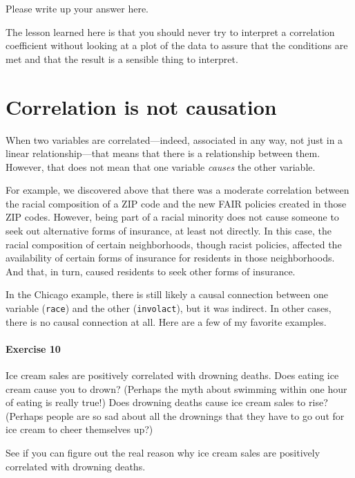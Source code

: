 \documentclass[
]{book}
\begin{document}
Please write up your answer here.

The lesson learned here is that you should never try to interpret a correlation coefficient without looking at a plot of the data to assure that the conditions are met and that the result is a sensible thing to interpret.

\hypertarget{correlation-causation}{%
\section{Correlation is not causation}\label{correlation-causation}}

When two variables are correlated---indeed, associated in any way, not just in a linear relationship---that means that there is a relationship between them. However, that does not mean that one variable \emph{causes} the other variable.

For example, we discovered above that there was a moderate correlation between the racial composition of a ZIP code and the new FAIR policies created in those ZIP codes. However, being part of a racial minority does not cause someone to seek out alternative forms of insurance, at least not directly. In this case, the racial composition of certain neighborhoods, though racist policies, affected the availability of certain forms of insurance for residents in those neighborhoods. And that, in turn, caused residents to seek other forms of insurance.

In the Chicago example, there is still likely a causal connection between one variable (\texttt{race}) and the other (\texttt{involact}), but it was indirect. In other cases, there is no causal connection at all. Here are a few of my favorite examples.

\hypertarget{exercise-10-2}{%
\paragraph*{Exercise 10}\label{exercise-10-2}}

Ice cream sales are positively correlated with drowning deaths. Does eating ice cream cause you to drown? (Perhaps the myth about swimming within one hour of eating is really true!) Does drowning deaths cause ice cream sales to rise? (Perhaps people are so sad about all the drownings that they have to go out for ice cream to cheer themselves up?)

See if you can figure out the real reason why ice cream sales are positively correlated with drowning deaths.
\end{document}
